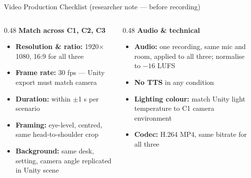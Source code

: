 \documentclass[aspectratio=169, 11pt]{beamer}
\begin{document}
\begin{frame}{Video Production Checklist \textnormal{\small (researcher note — before recording)}}
\small
\begin{columns}[T]
\begin{column}{0.48\textwidth}
\textbf{\color{kblue}Match across C1, C2, C3}
\begin{itemize}\setlength\itemsep{3pt}
  \item \textbf{Resolution \& ratio:} 1920$\times$1080, 16:9 for all three
  \item \textbf{Frame rate:} 30 fps — Unity export must match camera
  \item \textbf{Duration:} within $\pm$1 s per scenario
  \item \textbf{Framing:} eye-level, centred, same head-to-shoulder crop
  \item \textbf{Background:} same desk, setting, camera angle replicated in Unity scene
\end{itemize}
\end{column}
\begin{column}{0.48\textwidth}
\textbf{\color{kblue}Audio \& technical}
\begin{itemize}\setlength\itemsep{3pt}
  \item \textbf{Audio:} one recording, same mic and room, applied to all three; normalise to $-16$ LUFS
  \item \textbf{No TTS} in any condition
  \item \textbf{Lighting colour:} match Unity light temperature to C1 camera environment
  \item \textbf{Codec:} H.264 MP4, same bitrate for all three
\end{itemize}
\vspace{6pt}
\end{column}
\end{columns}
\end{frame}
\end{document}
